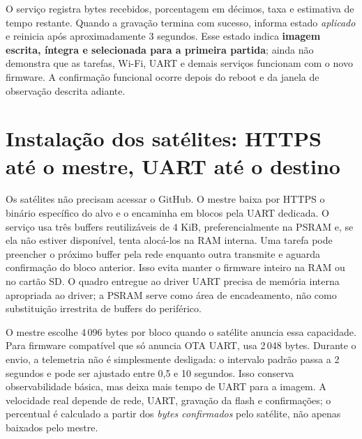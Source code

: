 O serviço registra bytes recebidos, porcentagem em décimos, taxa e estimativa de tempo restante. Quando a gravação termina com sucesso, informa estado \emph{aplicado} e reinicia após aproximadamente 3 segundos. Esse estado indica \textbf{imagem escrita, íntegra e selecionada para a primeira partida}; ainda não demonstra que as tarefas, Wi-Fi, UART e demais serviços funcionam com o novo firmware. A confirmação funcional ocorre depois do reboot e da janela de observação descrita adiante.

\section{Instalação dos satélites: HTTPS até o mestre, UART até o destino}
Os satélites não precisam acessar o GitHub. O mestre baixa por HTTPS o binário específico do alvo e o encaminha em blocos pela UART dedicada. O serviço usa três buffers reutilizáveis de 4 KiB, preferencialmente na PSRAM e, se ela não estiver disponível, tenta alocá-los na RAM interna. Uma tarefa pode preencher o próximo buffer pela rede enquanto outra transmite e aguarda confirmação do bloco anterior. Isso evita manter o firmware inteiro na RAM ou no cartão SD. O quadro entregue ao driver UART precisa de memória interna apropriada ao driver; a PSRAM serve como área de encadeamento, não como substituição irrestrita de buffers do periférico.

O mestre escolhe 4\,096 bytes por bloco quando o satélite anuncia essa capacidade. Para firmware compatível que só anuncia OTA UART, usa 2\,048 bytes. Durante o envio, a telemetria não é simplesmente desligada: o intervalo padrão passa a 2 segundos e pode ser ajustado entre 0,5 e 10 segundos. Isso conserva observabilidade básica, mas deixa mais tempo de UART para a imagem. A velocidade real depende de rede, UART, gravação da flash e confirmações; o percentual é calculado a partir dos \emph{bytes confirmados} pelo satélite, não apenas baixados pelo mestre.

